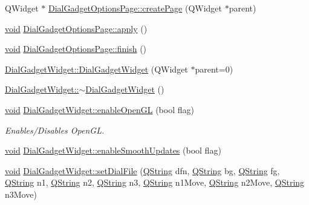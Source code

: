 \begin{DoxyCompactItemize}
\item 
Q\-Widget $\ast$ \hyperlink{group___dial_plugin_gac2ea2636090b7981bddc06307c640fbb}{Dial\-Gadget\-Options\-Page\-::create\-Page} (Q\-Widget $\ast$parent)
\item 
\hyperlink{group___u_a_v_objects_plugin_ga444cf2ff3f0ecbe028adce838d373f5c}{void} \hyperlink{group___dial_plugin_gaacfb7eb82dfc96795090f651e40bd640}{Dial\-Gadget\-Options\-Page\-::apply} ()
\item 
\hyperlink{group___u_a_v_objects_plugin_ga444cf2ff3f0ecbe028adce838d373f5c}{void} \hyperlink{group___dial_plugin_gacc0c745076376c99081b3c52d916e209}{Dial\-Gadget\-Options\-Page\-::finish} ()
\item 
\hyperlink{group___dial_plugin_gac5397a4cc992266439aa3e8b1513c209}{Dial\-Gadget\-Widget\-::\-Dial\-Gadget\-Widget} (Q\-Widget $\ast$parent=0)
\item 
\hyperlink{group___dial_plugin_ga3e34cc3b776a627597b4c4823b358741}{Dial\-Gadget\-Widget\-::$\sim$\-Dial\-Gadget\-Widget} ()
\item 
\hyperlink{group___u_a_v_objects_plugin_ga444cf2ff3f0ecbe028adce838d373f5c}{void} \hyperlink{group___dial_plugin_gaad3e246709ada936d97644f6e87fba59}{Dial\-Gadget\-Widget\-::enable\-Open\-G\-L} (bool flag)
\begin{DoxyCompactList}\small\item\em Enables/\-Disables Open\-G\-L. \end{DoxyCompactList}\item 
\hyperlink{group___u_a_v_objects_plugin_ga444cf2ff3f0ecbe028adce838d373f5c}{void} \hyperlink{group___dial_plugin_ga6b6e527e9c2516f6dec2f6332a288a9f}{Dial\-Gadget\-Widget\-::enable\-Smooth\-Updates} (bool flag)
\item 
\hyperlink{group___u_a_v_objects_plugin_ga444cf2ff3f0ecbe028adce838d373f5c}{void} \hyperlink{group___dial_plugin_ga00bc4e8b1988a13cf8d1fff889444684}{Dial\-Gadget\-Widget\-::set\-Dial\-File} (\hyperlink{group___u_a_v_objects_plugin_gab9d252f49c333c94a72f97ce3105a32d}{Q\-String} dfn, \hyperlink{group___u_a_v_objects_plugin_gab9d252f49c333c94a72f97ce3105a32d}{Q\-String} bg, \hyperlink{group___u_a_v_objects_plugin_gab9d252f49c333c94a72f97ce3105a32d}{Q\-String} fg, \hyperlink{group___u_a_v_objects_plugin_gab9d252f49c333c94a72f97ce3105a32d}{Q\-String} n1, \hyperlink{group___u_a_v_objects_plugin_gab9d252f49c333c94a72f97ce3105a32d}{Q\-String} n2, \hyperlink{group___u_a_v_objects_plugin_gab9d252f49c333c94a72f97ce3105a32d}{Q\-String} n3, \hyperlink{group___u_a_v_objects_plugin_gab9d252f49c333c94a72f97ce3105a32d}{Q\-String} n1\-Move, \hyperlink{group___u_a_v_objects_plugin_gab9d252f49c333c94a72f97ce3105a32d}{Q\-String} n2\-Move, \hyperlink{group___u_a_v_objects_plugin_gab9d252f49c333c94a72f97ce3105a32d}{Q\-String} n3\-Move)

\end{DoxyCompactItemize}
